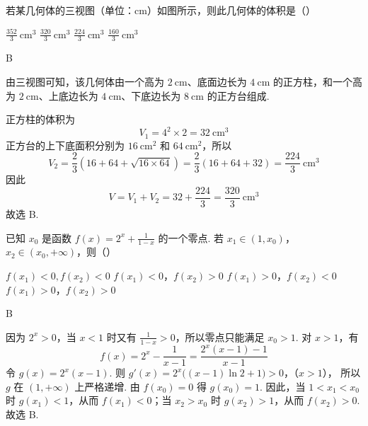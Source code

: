 \begin{problem}
若某几何体的三视图（单位：\(\mathrm{cm}\)）如图所示，则此几何体的体积是（\quad）


\choices
    {\(\frac{352}{3} \mathrm{~cm}^3\)}
    {\(\frac{320}{3} \mathrm{~cm}^3\)}
    {\(\frac{224}{3} \mathrm{~cm}^3\)}
    {\(\frac{160}{3} \mathrm{~cm}^3\)}

\begin{answer}
B
\end{answer}

\begin{solution}
由三视图可知，该几何体由一个高为 \(2\mathrm{~cm}\)、底面边长为
\(4\mathrm{~cm}\) 的正方柱，和一个高为 \(2\mathrm{~cm}\)、上底边长为
\(4\mathrm{~cm}\)、下底边长为 \(8\mathrm{~cm}\) 的正方台组成.

正方柱的体积为
\[
V_1=4^2\times2=32\mathrm{~cm}^3
\]
正方台的上下底面积分别为 \(16\mathrm{~cm}^2\) 和 \(64\mathrm{~cm}^2\)，所以
\[
V_2=\frac{2}{3}\left(16+64+\sqrt{16\times64}\right)
=\frac{2}{3}(16+64+32)=\frac{224}{3}\mathrm{~cm}^3
\]
因此
\[
V=V_1+V_2=32+\frac{224}{3}=\frac{320}{3}\mathrm{~cm}^3
\]
故选 B.
\end{solution}
\end{problem}

\begin{problem}
已知 \(x_0\) 是函数 \(f(x) = 2^x + \frac{1}{1 - x}\) 的一个零点. 若 \(x_1 \in (1, x_0)\)，\(x_2 \in (x_0, +\infty)\)，则（\quad）

\choices
    {\(f(x_{1}) < 0, f(x_{2}) < 0\)}
    {\(f(x_{1}) < 0\)，\(f(x_{2}) > 0\)}
    {\(f(x_{1}) > 0\)，\(f(x_{2}) < 0\)}
    {\(f(x_{1}) > 0\)，\(f(x_{2}) > 0\)}

\begin{answer}
B
\end{answer}

\begin{solution}
因为 \(2^x>0\)，当 \(x<1\) 时又有 \(\frac{1}{1-x}>0\)，所以零点只能满足 \(x_0>1\). 对 \(x>1\)，有
\[
f(x)=2^x-\frac{1}{x-1}
=\frac{2^x(x-1)-1}{x-1}
\]
令 \(g(x)=2^x(x-1)\). 则
\(g'(x)=2^x\bigl((x-1)\ln2+1\bigr)>0\)，（\(x>1\)），
所以 \(g\) 在 \((1,+\infty)\) 上严格递增. 由 \(f(x_0)=0\) 得
\(g(x_0)=1\). 因此，当 \(1<x_1<x_0\) 时 \(g(x_1)<1\)，从而
\(f(x_1)<0\)；当 \(x_2>x_0\) 时 \(g(x_2)>1\)，从而
\(f(x_2)>0\). 故选 B.
\end{solution}
\end{problem}

